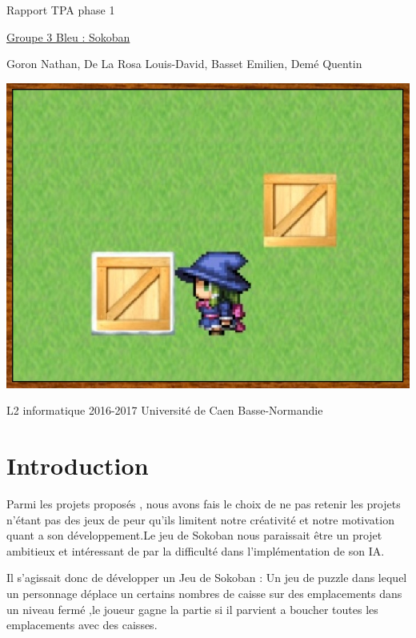 \documentclass{article}
\begin{document}
\begin{titlepage}
\begin{center}
\Huge Rapport TPA phase 1

\normalsize
\vspace{0.5cm}
\Large {\underline{ Groupe 3 Bleu : Sokoban} }

\vspace{1cm}

\normalsize
Goron Nathan, De La Rosa Louis-David, Basset Emilien, Demé Quentin

\vspace{1cm}
\begin{center}
\includegraphics[scale=0.7]{../Screenshots/main.jpg}
\end{center}
\vspace{3.5cm}
L2 informatique 2016-2017 Université de Caen Basse-Normandie
\end{center}
\end{titlepage}


\newpage
\tableofcontents

\newpage
	\section{Introduction}
	Parmi les projets proposés , nous avons fais le choix de ne pas retenir les projets n'étant pas des jeux de peur qu'ils limitent notre créativité et notre motivation quant a son développement.Le jeu de Sokoban nous paraissait être un projet ambitieux et intéressant de par la difficulté dans l'implémentation de son IA.

	Il s'agissait donc de développer un Jeu de Sokoban : Un jeu de puzzle dans lequel un personnage déplace un certains nombres de caisse sur des emplacements dans un niveau fermé ,le joueur gagne la partie si il parvient a boucher toutes les emplacements avec des caisses. 
	\newpage
\end{document}
